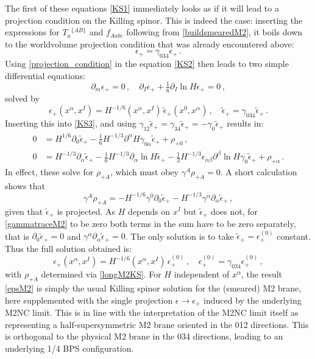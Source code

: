 \documentclass[11pt]{article}
\newcommand{\be}{\begin{equation}}
\newcommand{\ee}{\end{equation}}
\newcommand{\epsc}{\epsilon^{(0)}}
\numberwithin{equation}{section}
\begin{document}
{{The first of these equations \eqref{KS1} immediately looks as if it will lead to a projection condition on the Killing spinor.
This is indeed the case: inserting the expressions for $T_a{}^{\{AB\}}$ and $f_{Aabc}$ following from \eqref{buildsmearedM2}, it boils down to the worldvolume projection condition that was already encountered above:
\be
\epsilon_+ = \gamma_{034} \epsilon_+ \,.
\label{projection_condition}
\ee
Using \eqref{projection_condition} in the equation \eqref{KS2} then leads to two simple differential equations: 
\be
\partial_m \epsilon_+ = 0 \,,\quad  \partial_I \epsilon_+ + \tfrac16  \partial_I \ln H \epsilon_+ = 0 \,,
\label{M2smearedHcondition}
\ee
solved by
\be
\epsilon_+(x^\alpha, x^I) = H^{-1/6} ( x^\alpha,x^I)\, \tilde \epsilon_+(x^0,x^\alpha) \,,\quad
\tilde \epsilon_+ = \gamma_{034} \tilde \epsilon_+ \,.
\ee
Inserting this into \eqref{KS3}, and using $\gamma_{12} \tilde \epsilon_+ = \gamma_{34} \tilde \epsilon_+ = - \gamma_0 \tilde \epsilon_+$ results in:
\begin{subequations} \label{longM2KS}
\begin{align}
0& = H^{1/6} \partial_0 \tilde \epsilon_+ - \tfrac16 H^{-1/3} \partial^\alpha H \gamma_{0 \alpha} \tilde \epsilon_+  + \rho_{+0}\,,
\\[4pt]
0&= H^{-1/3} \partial_\alpha \tilde \epsilon_+ - \tfrac16 H^{-1/3} \partial_\alpha \ln H \tilde \epsilon_+  - \tfrac{1}{3} H^{-1/3} \epsilon_{\alpha \beta} \partial^\beta \ln H \gamma_{0}\tilde \epsilon_+
+ \rho_{+\alpha}\,.
\end{align}
\end{subequations} 
In effect, these solve for $\rho_{+A}$, which must obey $\gamma^A \rho_{+A} = 0$.
A short calculation shows that
\be
\gamma^A \rho_{+A} = - H^{-1/6} \gamma^0 \partial_0 \tilde \epsilon_+ 
 - H^{-1/3} \gamma^\alpha \partial_\alpha \tilde \epsilon_+ \,,
 \label{gammatraceM2}
\ee
given that $\tilde \epsilon_+$ is projected. 
As $H$ depends on $x^I$ but $\tilde \epsilon_+$ does not, for \eqref{gammatraceM2} to be zero both terms in the sum have to be zero separately, that is $\partial_0 \tilde \epsilon_+ = 0$ and $\gamma^\alpha \partial_\alpha \tilde \epsilon_+ = 0$.
The only solution is to take $\tilde \epsilon_+ = \epsc_+$ constant.
Thus the full solution obtained is: 
\be
\epsilon_+(x^\alpha, x^I) = H^{-1/6} ( x^\alpha,x^I) \, \epsc_+ \,,\quad
 \epsc_+ = \gamma_{034} \epsc_+ \,,
\label{epsM2}
\ee
with $\rho_{+A}$ determined via \eqref{longM2KS}.
For $H$ independent of $x^\alpha$, the result \eqref{epsM2} is simply the usual Killing spinor solution for the (smeared) M2 brane, here supplemented with the single projection $\epsilon \rightarrow \epsilon_+$ induced by the underlying M2NC limit. 
This is in line with the interpretation of the M2NC limit itself as representing a half-supersymmetric M2 brane oriented in the 012 directions.
This is orthogonal to the physical M2 brane in the 034 directions, leading to an underlying 1/4 BPS configuration.

}}
\end{document}
